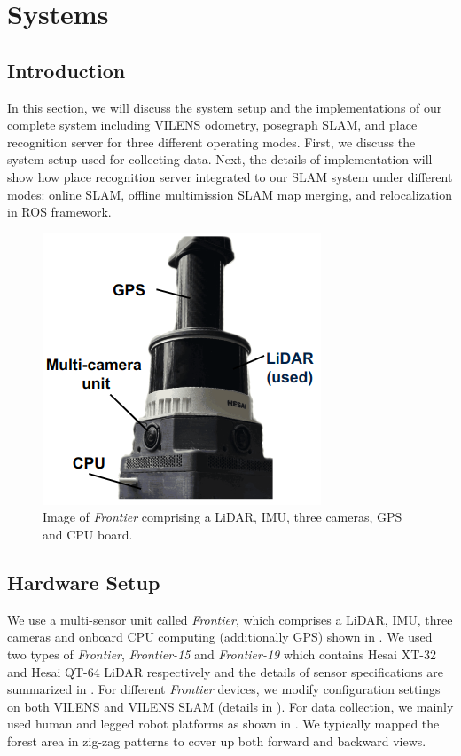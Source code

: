 \chapter{Systems}
\label{ch:system}
\section{Introduction}
In this section, we will discuss the system setup and the implementations of our complete system including VILENS odometry, posegraph SLAM, and place recognition server for three different operating modes. First, we discuss the system setup used for collecting data. Next, the details of implementation will show how place recognition server integrated to our SLAM system under different modes: online SLAM, offline multimission SLAM map merging, and relocalization in ROS framework.

\begin{figure}[htbp]
  \centering
  \includegraphics[width=0.4\columnwidth]{pics/setup_Frontier_pic2.png}
  \caption{Image of \emph{Frontier} comprising a LiDAR, IMU, three cameras, GPS and CPU board. }
  \label{fig:frontier}
\end{figure}

\section{Hardware Setup}
\label{sec:system_setup}
We use a multi-sensor unit called \emph{Frontier}, which comprises a LiDAR, IMU, three cameras and onboard CPU computing (additionally GPS) shown in . We used two types of \emph{Frontier}, \emph{Frontier-15} and \emph{Frontier-19} which contains Hesai XT-32 and Hesai QT-64 LiDAR respectively and the details of sensor specifications are summarized in . For different \emph{Frontier} devices, we modify configuration settings on both VILENS and VILENS SLAM (details in \cite{wisth2023tro,proudman2022ras}). For data collection, we mainly used human and legged robot platforms as shown in . We typically mapped the forest area in zig-zag patterns to cover up both forward and backward views. 



